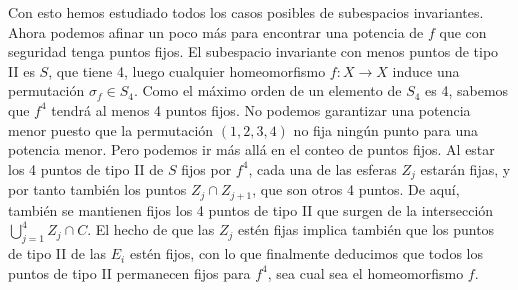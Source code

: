 \documentclass[twoside]{article}
\begin{document}
\begin{solucion}
Con esto hemos estudiado todos los casos posibles de subespacios invariantes. Ahora podemos afinar un poco más para encontrar una potencia de $f$ que con seguridad tenga puntos fijos. El subespacio invariante con menos puntos de tipo II es $S$, que tiene 4, luego cualquier homeomorfismo $f:X\to X$ induce una permutación $\sigma_f\in S_4$. Como el máximo orden de un elemento de $S_4$ es 4, sabemos que $f^4$ tendrá al menos 4 puntos fijos. No podemos garantizar una potencia menor puesto que la permutación $(1,2,3,4)$ no fija ningún punto para una potencia menor. Pero podemos ir más allá en el conteo de puntos fijos. Al estar los 4 puntos de tipo II de $S$ fijos por $f^4$, cada una de las esferas $Z_j$ estarán fijas, y por tanto también los puntos $Z_j\cap Z_{j+1}$, que son otros 4 puntos. De aquí, también se mantienen fijos los 4 puntos de tipo II que surgen de la intersección $\bigcup_{j=1}^4Z_j\cap C$. El hecho de que las $Z_j$ estén fijas implica también que los puntos de tipo II de las $E_i$ estén fijos, con lo que finalmente deducimos que todos los puntos de tipo II permanecen fijos para $f^4$, sea cual sea el homeomorfismo $f$.


\end{solucion}
\end{document}
